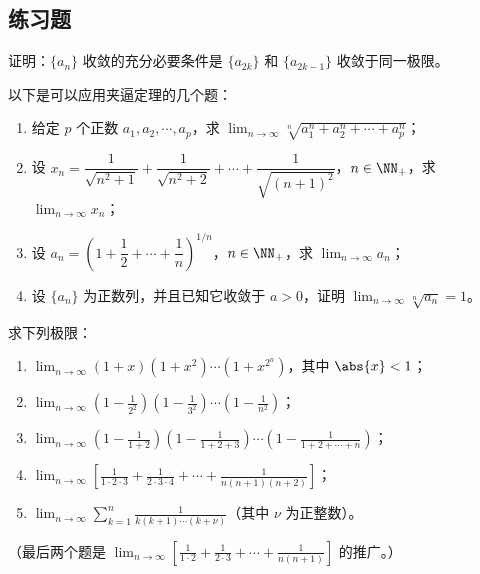 \subsection{练习题}

\begin{xexercise}[1]
证明：$\{a_n\}$ 收敛的充分必要条件是 $\{a_{2k}\}$ 和 $\{a_{2k-1}\}$ 收敛于同一极限。
\end{xexercise}

\begin{xexercise}[2]
以下是可以应用夹逼定理的几个题：
  \begin{enumerate}[label=(\arabic*)]
    \item 给定 $p$ 个正数 $a_1,a_2,\cdots,a_p$，求 $\displaystyle\lim_{n\to\infty}\sqrt[n]{a_1^n+a_2^n+\cdots+a_p^n}$；
    \item 设 $x_n=\dfrac1{\sqrt{n^2+1}}+\dfrac1{\sqrt{n^2+2}}+\cdots+\dfrac1{\sqrt{(n+1)^2}}$，$n\in\NN_+$，求 $\displaystyle\lim_{n\to\infty}x_n$；
    \item 设 $a_n=\left(1+\dfrac12+\cdots+\dfrac1n\right)^{1/n}$，$n\in\NN_+$，求 $\displaystyle\lim_{n\to\infty}a_n$；
    \item 设 $\{a_n\}$ 为正数列，并且已知它收敛于 $a>0$，证明 $\displaystyle\lim_{n\to\infty}\sqrt[n]{a_n}=1$。
  \end{enumerate}
\end{xexercise}

\begin{xexercise}[3]
求下列极限：
  \begin{enumerate}[label=(\arabic*)]
    \item $\displaystyle\lim_{n\to\infty}(1+x)(1+x^2)\cdots(1+x^{2^n})$，其中 $\abs{x}<1$；
    \item $\displaystyle\lim_{n\to\infty}\left(1-\frac1{2^2}\right)\left(1-\frac1{3^2}\right)\cdots\left(1-\frac1{n^2}\right)$；
    \item $\displaystyle\lim_{n\to\infty}\left(1-\frac1{1+2}\right)\left(1-\frac1{1+2+3}\right)\cdots\left(1-\frac1{1+2+\cdots+n}\right)$；
    \item $\displaystyle\lim_{n\to\infty}\left[\frac1{1\cdot2\cdot3}+\frac1{2\cdot3\cdot4}+\cdots+\frac1{n(n+1)(n+2)}\right]$；
    \item $\displaystyle\lim_{n\to\infty}\sum_{k=1}^n\frac1{k(k+1)\cdots(k+\nu)}$（其中 $\nu$ 为正整数）。
  \end{enumerate}
  （最后两个题是 $\displaystyle\lim_{n\to\infty}\left[\frac1{1\cdot2}+\frac1{2\cdot3}+\cdots+\frac1{n(n+1)}\right]$ 的推广。）
\end{xexercise}

